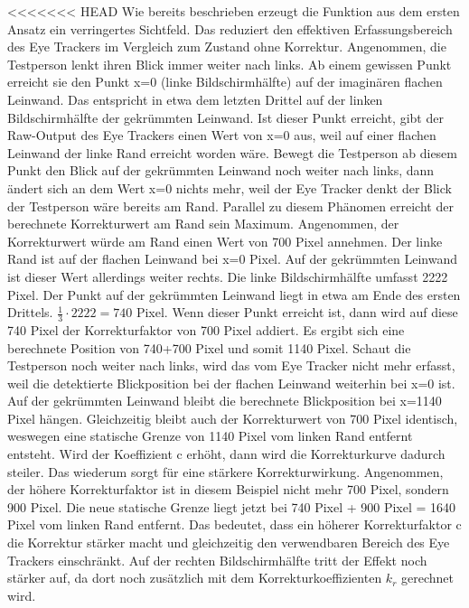 <<<<<<< HEAD
Wie bereits beschrieben erzeugt die Funktion aus dem ersten Ansatz ein verringertes Sichtfeld. Das reduziert den effektiven Erfassungsbereich des Eye Trackers im Vergleich zum Zustand ohne Korrektur. Angenommen, die Testperson lenkt ihren Blick immer weiter nach links. Ab einem gewissen Punkt erreicht sie den Punkt x=0 (linke Bildschirmhälfte) auf der imaginären flachen Leinwand. Das entspricht in etwa dem letzten Drittel auf der linken Bildschirmhälfte der gekrümmten Leinwand. Ist dieser Punkt erreicht, gibt der \Gls{Raw-Output} des Eye Trackers einen Wert von x=0 aus, weil auf einer flachen Leinwand der linke Rand erreicht worden wäre. Bewegt die Testperson ab diesem Punkt den Blick auf der gekrümmten Leinwand noch weiter nach links, dann ändert sich an dem Wert x=0 nichts mehr, weil der Eye Tracker denkt der Blick der Testperson wäre bereits am Rand. Parallel zu diesem Phänomen erreicht der berechnete Korrekturwert am Rand sein Maximum. Angenommen, der Korrekturwert würde am Rand einen Wert von 700 Pixel annehmen. Der linke Rand ist auf der flachen Leinwand bei x=0 Pixel. Auf der gekrümmten Leinwand ist dieser Wert allerdings weiter rechts. Die linke Bildschirmhälfte umfasst 2222 Pixel. Der Punkt auf der gekrümmten Leinwand liegt in etwa am Ende des ersten Drittels. $\frac{1}{3} \cdot 2222 = 740$ Pixel. Wenn dieser Punkt erreicht ist, dann wird auf diese 740 Pixel der Korrekturfaktor von 700 Pixel addiert. Es ergibt sich eine berechnete Position von 740+700 Pixel und somit 1140 Pixel. Schaut die Testperson noch weiter nach links, wird das vom Eye Tracker nicht mehr erfasst, weil die detektierte Blickposition bei der flachen Leinwand weiterhin bei x=0 ist. Auf der gekrümmten Leinwand bleibt die berechnete Blickposition bei x=1140 Pixel hängen. Gleichzeitig bleibt auch der Korrekturwert von 700 Pixel identisch, weswegen eine statische Grenze von 1140 Pixel vom linken Rand entfernt entsteht. Wird der Koeffizient c erhöht, dann wird die Korrekturkurve dadurch steiler. Das wiederum sorgt für eine stärkere Korrekturwirkung. Angenommen, der höhere Korrekturfaktor ist in diesem Beispiel nicht mehr 700 Pixel, sondern 900 Pixel. Die neue statische Grenze liegt jetzt bei 740 Pixel + 900 Pixel = 1640 Pixel vom linken Rand entfernt. Das bedeutet, dass ein höherer Korrekturfaktor c die Korrektur stärker macht und gleichzeitig den verwendbaren Bereich des Eye Trackers einschränkt. Auf der rechten Bildschirmhälfte tritt der Effekt noch stärker auf, da dort noch zusätzlich mit dem Korrekturkoeffizienten $k_r$ gerechnet wird. 


